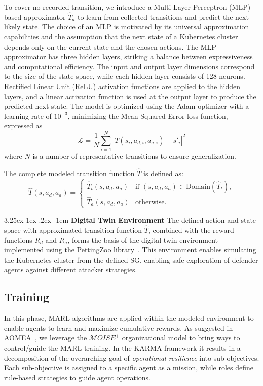 \documentclass[conference]{IEEEtran}
\makeatletter
\renewcommand\paragraph{\@startsection{paragraph}{5}{\z@}%
  {3.25ex \@plus1ex \@minus.2ex}%
  {-1em}%
  {\normalfont\normalsize\bfseries}}
\makeatother
\begin{document}
To cover no recorded transition, we introduce a Multi-Layer Perceptron (MLP)-based approximator $\hat{T}_a$ to learn from collected transitions and predict the next likely state. The choice of an MLP is motivated by its universal approximation capabilities and the assumption that the next state of a Kubernetes cluster depends only on the current state and the chosen actions.
The MLP approximator has three hidden layers, striking a balance between expressiveness and computational efficiency. The input and output layer dimensions correspond to the size of the state space, while each hidden layer consists of 128 neurons. Rectified Linear Unit (ReLU) activation functions are applied to the hidden layers, and a linear activation function is used at the output layer to produce the predicted next state. The model is optimized using the Adam optimizer with a learning rate of $10^{-3}$, minimizing the Mean Squared Error loss function, expressed as
$$
\mathcal{L} = \frac{1}{N} \sum_{i=1}^N |T(s_i, a_{d,i}, a_{a,i}) - s'_i|^2
$$
where $N$ is a number of representative transitions to ensure generalization.

The complete modeled transition function $\hat{T}$ is defined as:
$$
\hat{T}(s, a_d, a_a) = 
\begin{cases} 
\hat{T}_t(s, a_d, a_a) & \text{if } (s, a_d, a_a) \in \text{Domain}(\hat{T}_t), \\
\hat{T}_a(s, a_d, a_a) & \text{otherwise}.
\end{cases}
$$

\noindent \paragraph{\textbf{Digital Twin Environment}} The defined action and state space with approximated transition function $\hat{T}$, combined with the reward functions $R_d$ and $R_a$, forms the basis of the digital twin environment implemented using the PettingZoo library~\cite{Terry2021}. This environment enables simulating the Kubernetes cluster from the defined SG, enabling safe exploration of defender agents against different attacker strategies.



\subsection{Training}
\label{sec:training}

In this phase, MARL algorithms are applied within the modeled environment to enable agents to learn and maximize cumulative rewards. As suggested in AOMEA~\cite{soule2024aomea}, we leverage the $\mathcal{M}OISE^+$ organizational model to bring ways to control/guide the MARL training. In the KARMA framework it results in a decomposition of the overarching goal of \textit{operational resilience} into sub-objectives. Each sub-objective is assigned to a specific agent as a mission, while roles define rule-based strategies to guide agent operations.\\
\end{document}
